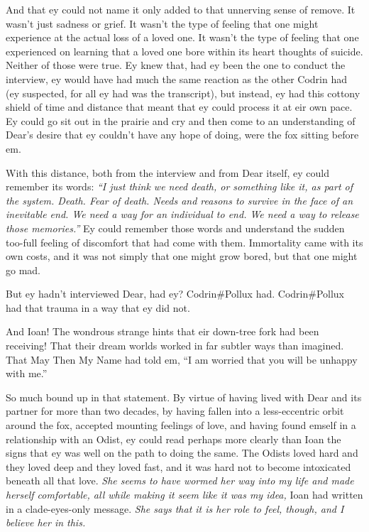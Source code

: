 And that ey could not name it only added to that unnerving sense of remove. It wasn't just sadness or grief. It wasn't the type of feeling that one might experience at the actual loss of a loved one. It wasn't the type of feeling that one experienced on learning that a loved one bore within its heart thoughts of suicide. Neither of those were true. Ey knew that, had ey been the one to conduct the interview, ey would have had much the same reaction as the other Codrin had (ey suspected, for all ey had was the transcript), but instead, ey had this cottony shield of time and distance that meant that ey could process it at eir own pace. Ey could go sit out in the prairie and cry and then come to an understanding of Dear's desire that ey couldn't have any hope of doing, were the fox sitting before em.

With this distance, both from the interview and from Dear itself, ey could remember its words: \emph{``I just think we need death, or something like it, as part of the system. Death. Fear of death. Needs and reasons to survive in the face of an inevitable end. We need a way for an individual to end. We need a way to release those memories.''} Ey could remember those words and understand the sudden too-full feeling of discomfort that had come with them. Immortality came with its own costs, and it was not simply that one might grow bored, but that one might go mad.

But ey hadn't interviewed Dear, had ey? Codrin\#Pollux had. Codrin\#Pollux had that trauma in a way that ey did not.

And Ioan! The wondrous strange hints that eir down-tree fork had been receiving! That their dream worlds worked in far subtler ways than imagined. That May Then My Name had told em, ``I am worried that you will be unhappy with me.''

So much bound up in that statement. By virtue of having lived with Dear and its partner for more than two decades, by having fallen into a less-eccentric orbit around the fox, accepted mounting feelings of love, and having found emself in a relationship with an Odist, ey could read perhaps more clearly than Ioan the signs that ey was well on the path to doing the same. The Odists loved hard and they loved deep and they loved fast, and it was hard not to become intoxicated beneath all that love. \emph{She seems to have wormed her way into my life and made herself comfortable, all while making it seem like it was my idea,} Ioan had written in a clade-eyes-only message. \emph{She says that it is her role to feel, though, and I believe her in this.}

